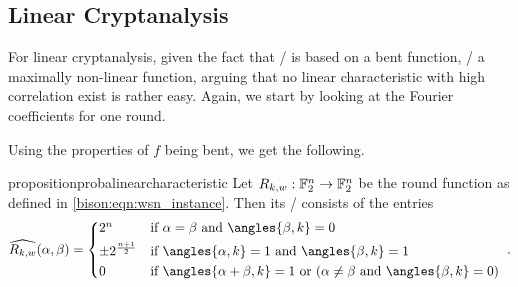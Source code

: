 \subsection{Linear Cryptanalysis}
For linear cryptanalysis, given the fact that \bison/ is based on a bent function, \ie/ a maximally non-linear function, arguing that no linear characteristic with high correlation exist is rather easy.
Again, we start by looking at the Fourier coefficients for one round.

Using the properties of $f$ being bent, we get the following.
\begin{restatable}{proposition}{probalinearcharacteristic}\label{prop:bison:lat}
    Let $R_{k,w} : \mathbb{F}_2^n \to \mathbb{F}_2^n$ be the round function as defined in \cref{bison:eqn:wsn_instance}.
    Then its \LAT/ consists of the entries
    \begin{equation}\label{bison:eqn:fc_round}
        \widehat{R_{k,w}}(\alpha,\beta) = \begin{cases*}
            2^n                    & if $\alpha = \beta$ and $\angles{\beta, k} = 0$ \\
            \pm2^{\frac{n+1}{2}} & if $\angles{\alpha, k} = 1$ and $\angles{\beta, k} = 1$ \\
            0                      & if $\angles{\alpha + \beta, k} = 1$ or $(\alpha \neq \beta$ and $\angles{\beta, k} = 0)$
        \end{cases*}.
    \end{equation}
\end{restatable}
